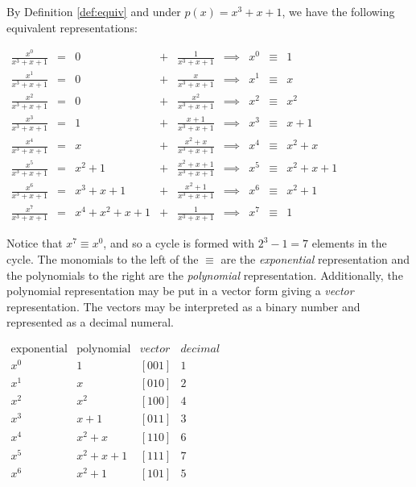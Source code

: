 \begin{example}
\label{ex:representations}
By Definition \ref{def:equiv} and 
under $p(x)=x^3+x+1$, we have the following equivalent representations:

\begin{center}
\begin{math}
\begin{array}{lcrclclclllll}
   \frac{x^0}{x^3+x+1} &=& 0     &+& \frac{1  }{x^3+x+1}     &\implies& x^0 &\equiv& 1   \\
   \frac{x^1}{x^3+x+1} &=& 0     &+& \frac{x  }{x^3+x+1}     &\implies& x^1 &\equiv& x   \\
   \frac{x^2}{x^3+x+1} &=& 0     &+& \frac{x^2}{x^3+x+1}     &\implies& x^2 &\equiv& x^2 \\
   \frac{x^3}{x^3+x+1} &=& 1     &+& \frac{x+1}{x^3+x+1}     &\implies& x^3 &\equiv& x+1 \\
   \frac{x^4}{x^3+x+1} &=& x     &+& \frac{x^2+x}{x^3+x+1}   &\implies& x^4 &\equiv& x^2+x \\
   \frac{x^5}{x^3+x+1} &=& x^2+1 &+& \frac{x^2+x+1}{x^3+x+1} &\implies& x^5 &\equiv& x^2+x+1 \\
   \frac{x^6}{x^3+x+1} &=& x^3+x+1 &+& \frac{x^2+1}{x^3+x+1} &\implies& x^6 &\equiv& x^2+1 \\
   \frac{x^7}{x^3+x+1} &=& x^4+x^2+x+1 &+& \frac{1}{x^3+x+1} &\implies& x^7 &\equiv& 1 
\end{array}
\end{math}
\end{center}

Notice that $x^7\equiv x^0$, and so a cycle is formed with 
$2^3-1=7$ elements in the cycle.
The monomials to the left of the $\equiv$ are the {\em exponential} 
representation and the polynomials to the right are the {\em polynomial}
representation.
Additionally, the polynomial representation may be put in a vector form giving a 
{\em vector} representation.
The vectors may be interpreted as a binary number and represented as a decimal numeral.

\begin{center}
\begin{math}
\begin{array}{cccc}
   \mbox{exponential} & \mbox{polynomial} & vector & decimal \\
   x^0 & 1       &[001] & 1  \\
   x^1 & x       &[010] & 2  \\
   x^2 & x^2     &[100] & 4  \\
   x^3 & x+1     &[011] & 3  \\
   x^4 & x^2+x   &[110] & 6  \\
   x^5 & x^2+x+1 &[111] & 7  \\
   x^6 & x^2+1   &[101] & 5  
\end{array}
\end{math}
\end{center}

\end{example}



